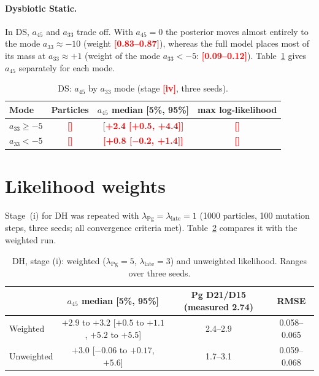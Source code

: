 \documentclass[11pt,a4paper]{article}
\newcommand{\TBD}[1]{\textcolor{red}{\textbf{[#1]}}}
\begin{document}
\begin{table}[h]
\centering
\caption{Log-evidence of the full and the reduced ($a_{45}=0$) model at stage (i), mean $\pm$ half-range over three seeds, and $\ln B=\ln\hat Z_{\mathrm{full}}-\ln\hat Z_{a_{45}=0}$. The last two columns give the $a_{45}$ box and its log-width, which enters $\ln\hat Z_{\mathrm{full}}$ as an Occam penalty.}
\label{tab:S_bayes}
\small
\end{table}

\paragraph{Dysbiotic Static.}
In DS, $a_{45}$ and $a_{33}$ trade off. With $a_{45}=0$ the posterior moves almost entirely to the mode $a_{33}\approx-10$ (weight \TBD{0.83--0.87}), whereas the full model places most of its mass at $a_{33}\approx+1$ (weight of the mode $a_{33}<-5$: \TBD{0.09--0.12}).
Table~\ref{tab:S_modes} gives $a_{45}$ separately for each mode.

\begin{table}[h]
\centering
\caption{DS: $a_{45}$ by $a_{33}$ mode (stage \TBD{iv}, three seeds).}
\label{tab:S_modes}
\begin{tabular}{lccc}
\toprule
Mode & Particles & $a_{45}$ median [5\%, 95\%] & max log-likelihood\\
\midrule
$a_{33}\ge-5$ & \TBD{} & \TBD{+2.4 [+0.5, +4.4]} & \TBD{}\\
$a_{33}<-5$   & \TBD{} & \TBD{+0.8 [$-$0.2, +1.4]} & \TBD{}\\
\bottomrule
\end{tabular}
\end{table}

\section{Likelihood weights}
\label{sec:S_lambda}
Stage~(i) for DH was repeated with $\lambda_{\mathrm{Pg}}=\lambda_{\mathrm{late}}=1$ (1000 particles, 100 mutation steps, three seeds; all convergence criteria met). Table~\ref{tab:S_lambda} compares it with the weighted run.

\begin{table}[h]
\centering
\caption{DH, stage (i): weighted ($\lambda_{\mathrm{Pg}}=5$, $\lambda_{\mathrm{late}}=3$) and unweighted likelihood. Ranges over three seeds.}
\label{tab:S_lambda}
\begin{tabular}{lccc}
\toprule
 & $a_{45}$ median [5\%, 95\%] & Pg D21/D15 (measured 2.74) & RMSE\\
\midrule
Weighted   & $+2.9$ to $+3.2$ [$+0.5$ to $+1.1$, $+5.2$ to $+5.5$] & 2.4--2.9 & 0.058--0.065\\
Unweighted & $+3.0$ [$-0.06$ to $+0.17$, $+5.6$] & 1.7--3.1 & 0.059--0.068\\
\bottomrule
\end{tabular}
\end{table}
\end{document}
